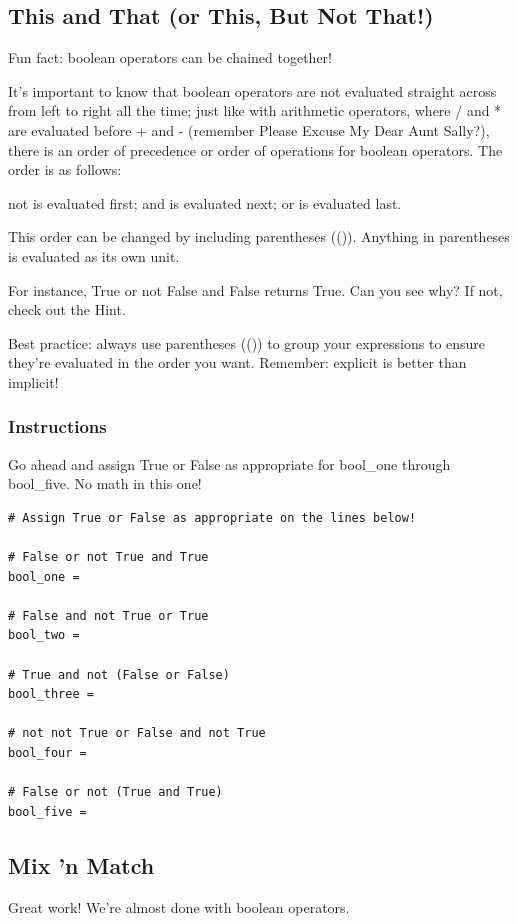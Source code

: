 \documentclass[12pt,a4paper,final,twoside,onecolumn,titlepage]{book}
\begin{document}
\subsection{This and That (or This, But Not That!)}

Fun fact: boolean operators can be chained together!

It's important to know that boolean operators are not evaluated straight across from left to right all the time; just like with arithmetic operators, where / and * are evaluated before + and - (remember Please Excuse My Dear Aunt Sally?), there is an order of precedence or order of operations for boolean operators. The order is as follows:

    not is evaluated first;
    and is evaluated next;
    or is evaluated last.

This order can be changed by including parentheses (()). Anything in parentheses is evaluated as its own unit.

For instance, True or not False and False returns True. Can you see why? If not, check out the Hint.

Best practice: always use parentheses (()) to group your expressions to ensure they're evaluated in the order you want. Remember: explicit is better than implicit!

\subsubsection{Instructions}

Go ahead and assign True or False as appropriate for bool\_one through bool\_five. No math in this one!

\begin{lstlisting}
# Assign True or False as appropriate on the lines below!

# False or not True and True
bool_one = 

# False and not True or True
bool_two = 

# True and not (False or False)
bool_three = 

# not not True or False and not True
bool_four = 

# False or not (True and True)
bool_five = 
\end{lstlisting}

\subsection{Mix 'n Match}

Great work! We're almost done with boolean operators.
\end{document}
